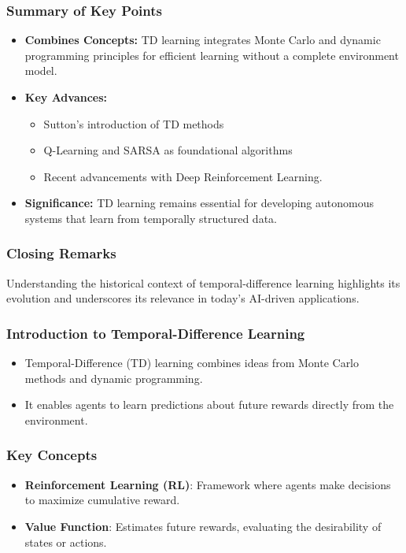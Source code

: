 \documentclass[aspectratio=169]{beamer}
\begin{document}
\begin{frame}[fragile]
    \frametitle{Summary of Key Points}
    \begin{itemize}
        \item \textbf{Combines Concepts:} TD learning integrates Monte Carlo and dynamic programming principles for efficient learning without a complete environment model.
        \item \textbf{Key Advances:}
            \begin{itemize}
                \item Sutton's introduction of TD methods
                \item Q-Learning and SARSA as foundational algorithms
                \item Recent advancements with Deep Reinforcement Learning.
            \end{itemize}
        \item \textbf{Significance:} TD learning remains essential for developing autonomous systems that learn from temporally structured data.
    \end{itemize}
\end{frame}

\begin{frame}[fragile]
    \frametitle{Closing Remarks}
    Understanding the historical context of temporal-difference learning highlights its evolution and underscores its relevance in today's AI-driven applications.
\end{frame}

\begin{frame}[fragile]
    \frametitle{Introduction to Temporal-Difference Learning}
    \begin{itemize}
        \item Temporal-Difference (TD) learning combines ideas from Monte Carlo methods and dynamic programming.
        \item It enables agents to learn predictions about future rewards directly from the environment.
    \end{itemize}
\end{frame}

\begin{frame}[fragile]
    \frametitle{Key Concepts}
    \begin{itemize}
        \item \textbf{Reinforcement Learning (RL)}: Framework where agents make decisions to maximize cumulative reward.
        \item \textbf{Value Function}: Estimates future rewards, evaluating the desirability of states or actions.
    \end{itemize}
\end{frame}
\end{document}
